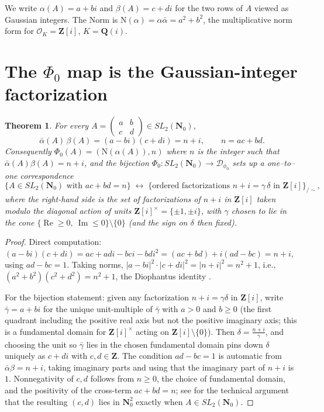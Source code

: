 \documentclass[11pt]{article}
\newtheorem{theorem}{Theorem}[section]
\theoremstyle{definition}
\newcommand{\Nz}{\mathbf{N}_0}
\newcommand{\Z}{\mathbf{Z}}
\newcommand{\Q}{\mathbf{Q}}
\newcommand{\OO}{\mathcal{O}}
\newcommand{\SLNz}{SL_2(\Nz)}
\newcommand{\re}{\operatorname{Re}}
\newcommand{\im}{\operatorname{Im}}
\newcommand{\Norm}{\mathrm{N}}
\begin{document}
We write $\alpha(A) = a + bi$ and $\beta(A) = c + di$ for the two rows of $A$ viewed as
Gaussian integers. The Norm is $\Norm(\alpha) = \alpha\bar\alpha = a^2+b^2$, the
multiplicative norm form for $\OO_K = \Z[i]$, $K = \Q(i)$.

\section{The $\Phi_0$ map is the Gaussian-integer factorization}\label{sec:gaussian-rederiv}

\begin{theorem}\label{thm:Phi0-is-Gaussian-factorization}
For every $A = \left(\begin{smallmatrix} a & b \\ c & d \end{smallmatrix}\right) \in \SLNz$,
\[
  \bar\alpha(A)\,\beta(A) = (a-bi)(c+di) = n + i, \qquad n = ac+bd.
\]
Consequently $\Phi_0(A) = (\Norm(\alpha(A)), n)$ where $n$ is the integer such that
$\bar\alpha(A)\beta(A) = n + i$, and the bijection $\Phi_0 \colon \SLNz \to \mathcal{D}_{\phi_0}$
sets up a one--to--one correspondence
\[
  \{A \in \SLNz \text{ with } ac+bd = n\}
  \;\longleftrightarrow\;
  \bigl\{ \text{ordered factorizations } n+i = \gamma\,\delta \text{ in } \Z[i] \bigr\}_{\!/\!\sim},
\]
where the right-hand side is the set of factorizations of $n+i$ in $\Z[i]$ taken modulo the
diagonal action of units $\Z[i]^\times = \{\pm 1, \pm i\}$, with $\gamma$ chosen to lie in
the cone $\{\re \ge 0,\ \im \le 0\} \setminus \{0\}$ (and the sign on $\delta$ then fixed).
\end{theorem}

\begin{proof}
Direct computation: $(a - bi)(c+di) = ac + adi - bci - bdi^2 = (ac+bd) + i(ad - bc) = n+i$,
using $ad - bc = 1$. Taking norms,
$|a-bi|^2 \cdot |c+di|^2 = |n+i|^2 = n^2+1$, i.e., $(a^2+b^2)(c^2+d^2) = n^2+1$, the
Diophantus identity \cite[Eq.~(2.3)]{shakov}.

For the bijection statement: given any factorization $n+i = \gamma\delta$ in $\Z[i]$, write
$\bar\gamma = a+bi$ for the unique unit-multiple of $\bar\gamma$ with $a > 0$ and $b \ge 0$
(the first quadrant including the positive real axis but not the positive imaginary axis;
this is a fundamental domain for $\Z[i]^\times$ acting on $\Z[i]\setminus\{0\}$). Then
$\delta = \frac{n+i}{\gamma}$, and choosing the unit so $\bar\gamma$ lies in the chosen
fundamental domain pins down $\delta$ uniquely as $c+di$ with $c,d \in \Z$. The condition
$ad - bc = 1$ is automatic from $\bar\alpha\beta = n+i$, taking imaginary parts and using
that the imaginary part of $n+i$ is $1$. Nonnegativity of $c,d$ follows from
$n \ge 0$, the choice of fundamental domain, and the positivity of the cross-term
$ac+bd = n$; see \cite[Lemma 2.10]{shakov} for the technical argument that the resulting
$(c,d)$ lies in $\Nz^2$ exactly when $A \in \SLNz$.
\end{proof}
\end{document}
